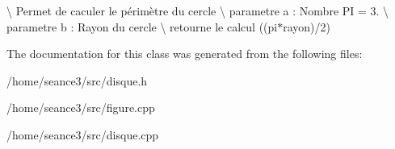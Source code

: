 \textbackslash{} Permet de caculer le périmètre du cercle \textbackslash{} parametre a \+: Nombre PI = 3. \textbackslash{} parametre b \+: Rayon du cercle \textbackslash{} retourne le calcul ((pi$\ast$rayon)/2) 

The documentation for this class was generated from the following files\+:\begin{DoxyCompactItemize}
\item 
/home/seance3/src/disque.\+h\item 
/home/seance3/src/figure.\+cpp\item 
/home/seance3/src/disque.\+cpp\end{DoxyCompactItemize}
